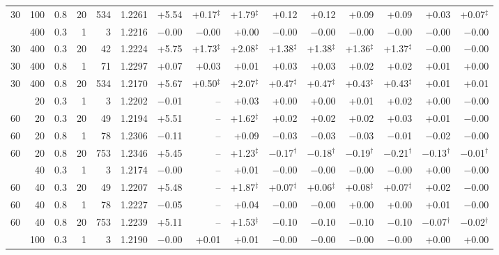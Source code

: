 \begin{tabular}{@{}rrrrr rrrrrrrrrr@{}}
30 & 100 & 0.8 & 20 & 534 & 1.2261 & +5.54 & +0.17$^{\ddagger}$ & +1.79$^{\ddagger}$ & +0.12 & +0.12 & +0.09 & +0.09 & +0.03 & +0.07$^{\ddagger}$ \\
\addlinespace[1pt]
30 & 400 & 0.3 & 1 & 3 & 1.2216 & $-$0.00 & $-$0.00 & +0.00 & $-$0.00 & $-$0.00 & $-$0.00 & $-$0.00 & $-$0.00 & $-$0.00 \\
30 & 400 & 0.3 & 20 & 42 & 1.2224 & +5.75 & +1.73$^{\ddagger}$ & +2.08$^{\ddagger}$ & +1.38$^{\ddagger}$ & +1.38$^{\ddagger}$ & +1.36$^{\ddagger}$ & +1.37$^{\ddagger}$ & $-$0.00 & $-$0.00 \\
30 & 400 & 0.8 & 1 & 71 & 1.2297 & +0.07 & +0.03 & +0.01 & +0.03 & +0.03 & +0.02 & +0.02 & +0.01 & +0.00 \\
30 & 400 & 0.8 & 20 & 534 & 1.2170 & +5.67 & +0.50$^{\ddagger}$ & +2.07$^{\ddagger}$ & +0.47$^{\ddagger}$ & +0.47$^{\ddagger}$ & +0.43$^{\ddagger}$ & +0.43$^{\ddagger}$ & +0.01 & +0.01 \\
\addlinespace[1pt]
60 & 20 & 0.3 & 1 & 3 & 1.2202 & $-$0.01 & -- & +0.03 & +0.00 & +0.00 & +0.01 & +0.02 & +0.00 & $-$0.00 \\
60 & 20 & 0.3 & 20 & 49 & 1.2194 & +5.51 & -- & +1.62$^{\ddagger}$ & +0.02 & +0.02 & +0.02 & +0.03 & +0.01 & $-$0.00 \\
60 & 20 & 0.8 & 1 & 78 & 1.2306 & $-$0.11 & -- & +0.09 & $-$0.03 & $-$0.03 & $-$0.03 & $-$0.01 & $-$0.02 & $-$0.00 \\
60 & 20 & 0.8 & 20 & 753 & 1.2346 & +5.45 & -- & +1.23$^{\ddagger}$ & $-$0.17$^{\dagger}$ & $-$0.18$^{\dagger}$ & $-$0.19$^{\dagger}$ & $-$0.21$^{\dagger}$ & $-$0.13$^{\dagger}$ & $-$0.01$^{\dagger}$ \\
\addlinespace[1pt]
60 & 40 & 0.3 & 1 & 3 & 1.2174 & $-$0.00 & -- & +0.01 & $-$0.00 & $-$0.00 & $-$0.00 & $-$0.00 & +0.00 & $-$0.00 \\
60 & 40 & 0.3 & 20 & 49 & 1.2207 & +5.48 & -- & +1.87$^{\ddagger}$ & +0.07$^{\ddagger}$ & +0.06$^{\ddagger}$ & +0.08$^{\ddagger}$ & +0.07$^{\ddagger}$ & +0.02 & $-$0.00 \\
60 & 40 & 0.8 & 1 & 78 & 1.2227 & $-$0.05 & -- & +0.04 & $-$0.00 & $-$0.00 & +0.00 & +0.00 & +0.01 & $-$0.00 \\
60 & 40 & 0.8 & 20 & 753 & 1.2239 & +5.11 & -- & +1.53$^{\ddagger}$ & $-$0.10 & $-$0.10 & $-$0.10 & $-$0.10 & $-$0.07$^{\dagger}$ & $-$0.02$^{\dagger}$ \\
\addlinespace[1pt]
60 & 100 & 0.3 & 1 & 3 & 1.2190 & $-$0.00 & +0.01 & +0.01 & $-$0.00 & $-$0.00 & $-$0.00 & $-$0.00 & +0.00 & +0.00 \\

\end{tabular}
